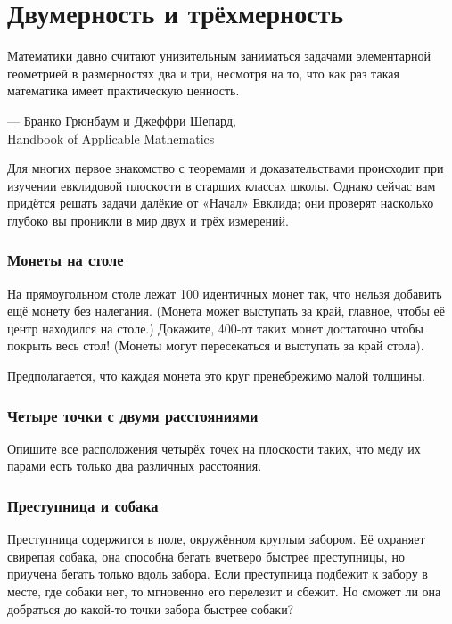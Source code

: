 \chapter{Двумерность и трёхмерность}

\setlength{\epigraphwidth}{.83\textwidth}
\epigraph{Математики давно считают унизительным заниматься задачами элементарной геометрией в размерностях два и три, несмотря на то, что как раз такая математика имеет практическую ценность.}{--- Бранко Грюнбаум и Джеффри Шепард,\\ Handbook of Applicable Mathematics}

Для многих первое знакомство с теоремами и доказательствами
происходит при изучении евклидовой плоскости
в старших классах школы.
Однако сейчас вам придётся решать задачи далёкие от «Начал» Евклида;
они проверят насколько глубоко вы проникли в мир двух и трёх измерений.

\subsection*{Монеты на столе}

На прямоугольном столе лежат 100 идентичных монет так, что нельзя добавить ещё монету без налегания.
(Монета может выступать за край, главное, чтобы её центр находился на столе.)
Докажите, 400-от таких монет достаточно чтобы покрыть весь стол!
(Монеты могут пересекаться и выступать за край стола).

Предполагается, что каждая монета это круг пренебрежимо малой толщины.

\subsection*{Четыре точки с двумя расстояниями}

Опишите все расположения четырёх точек на плоскости таких, что меду их парами есть только два различных расстояния.

\subsection*{Преступница и собака}

Преступница содержится в поле, окружённом круглым забором.
Её охраняет свирепая собака, она способна бегать вчетверо быстрее преступницы, но приучена бегать только вдоль забора.
Если преступница подбежит к забору в месте, где собаки нет, то мгновенно его перелезит и сбежит.
Но сможет ли она добраться до какой-то точки забора быстрее собаки?

